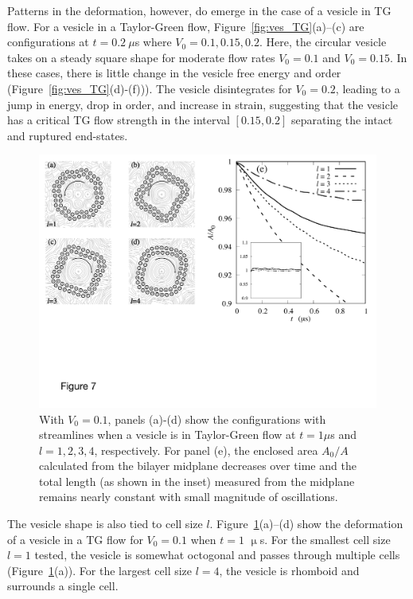\documentclass[prb,preprint,showpacs,preprintnumbers,amsmath,amssymb,longbibliography]{revtex4-1}
\begin{document}
Patterns in the deformation, however, do emerge in the case of a vesicle in TG flow.
For a vesicle in a Taylor-Green flow, Figure~\ref{fig:ves_TG}(a)--(c) are configurations at $t=0.2\  \mu$s where $V_0=0.1,0.15,0.2$.
Here, the circular vesicle takes on a steady square shape for moderate flow rates $V_0 = 0.1$ and $V_0 = 0.15$.
In these cases, there is little change in the vesicle free energy and order (Figure~\ref{fig:ves_TG}(d)-(f))).
The vesicle disintegrates for $V_0 = 0.2$, leading to a jump in energy, drop in order, and increase in strain,
suggesting that the vesicle has a critical TG flow strength in the interval $[0.15, 0.2]$ separating the
intact and ruptured end-states.

\begin{figure}
  \begin{center}
\includegraphics[width=1.0\textwidth]{Figures/Figure7.pdf}
  \end{center}
  \vspace{-20pt}  
  \caption{\label{fig:BTG_Scale} With $V_0=0.1$, panels (a)-(d) show the configurations with streamlines when a vesicle is in Taylor-Green flow at $t=1 \mu$s and $l= 1,2,3,4$, respectively.
  For panel (e), the enclosed area $A_0/A$ calculated from the bilayer midplane decreases over time and the total length (as shown in the inset) measured from the midplane remains nearly constant with small magnitude of oscillations.
  }
\end{figure}

The vesicle shape is also tied to cell size $l$.  
Figure~\ref{fig:BTG_Scale}(a)--(d) show the deformation of a vesicle in a
TG flow for $V_0=0.1$ when $t = 1$ $\upmu$s.  
For the smallest cell size $l = 1$ tested, the vesicle is somewhat octogonal
and passes through multiple cells (Figure~\ref{fig:BTG_Scale}(a)).
For the largest cell size $l = 4$,
the vesicle is rhomboid and surrounds a single cell. 
\end{document}
